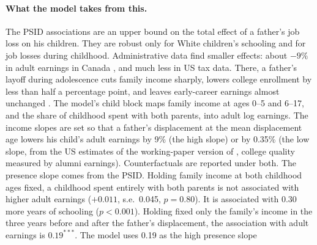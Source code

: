 \paragraph{What the model takes from this.} The PSID associations are an upper bound on the total effect of a father's
job loss on his children. They are robust only for White children's schooling and for job losses during childhood.
Administrative data find smaller effects: about $-9\%$ in adult earnings in Canada
\citep{oreopoulos2008intergenerational}, and much less in US tax data. There, a father's layoff during adolescence
cuts family income sharply, lowers college enrollment by less than half a percentage point, and leaves early-career
earnings almost unchanged \citep{hilger2016parental}. The model's child block maps family income at ages 0--5 and
6--17, and the share of childhood spent with both parents, into adult log earnings. The income slopes are set so that
a father's displacement at the mean displacement age lowers his child's adult earnings by 9\% (the high slope) or by
0.35\% (the low slope, from the US estimates of the working-paper version of \citet{hilger2016parental}, college quality measured by alumni earnings). Counterfactuals are reported under both. The presence slope comes from
the PSID. Holding family income at both childhood ages fixed, a childhood spent entirely with both parents is not
associated with higher adult earnings ($+0.011$, s.e.\ 0.045, $p=0.80$). It is associated with 0.30 more years of
schooling ($p<0.001$). Holding fixed only the family's income in the three years before and after the father's
displacement, the association with adult earnings is $0.19^{***}$. The model uses 0.19 as the high presence slope
